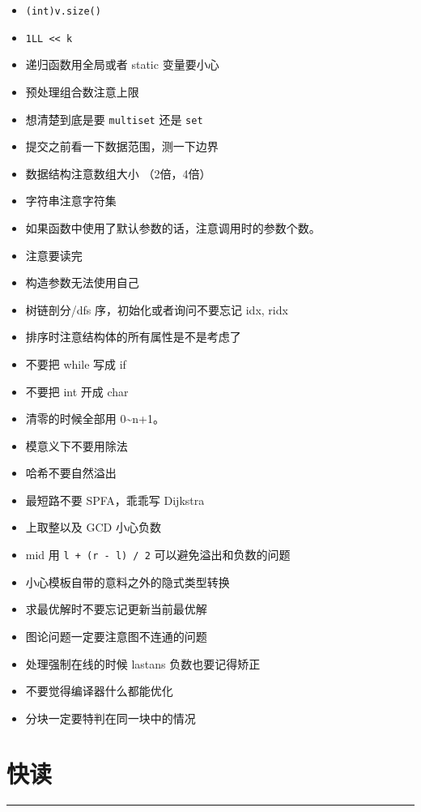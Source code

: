 \documentclass[]{article}
\providecommand{\tightlist}{%
  \setlength{\itemsep}{0pt}\setlength{\parskip}{0pt}}
\begin{document}
\begin{itemize}
\tightlist
\item
  \texttt{(int)v.size()}
\item
  \texttt{1LL\ \textless{}\textless{}\ k}
\item
  递归函数用全局或者 static 变量要小心
\item
  预处理组合数注意上限
\item
  想清楚到底是要 \texttt{multiset} 还是 \texttt{set}
\item
  提交之前看一下数据范围，测一下边界
\item
  数据结构注意数组大小 （2倍，4倍）
\item
  字符串注意字符集
\item
  如果函数中使用了默认参数的话，注意调用时的参数个数。
\item
  注意要读完
\item
  构造参数无法使用自己
\item
  树链剖分/dfs 序，初始化或者询问不要忘记 idx, ridx
\item
  排序时注意结构体的所有属性是不是考虑了
\item
  不要把 while 写成 if
\item
  不要把 int 开成 char
\item
  清零的时候全部用 0\textasciitilde n+1。
\item
  模意义下不要用除法
\item
  哈希不要自然溢出
\item
  最短路不要 SPFA，乖乖写 Dijkstra
\item
  上取整以及 GCD 小心负数
\item
  mid 用 \texttt{l\ +\ (r\ -\ l)\ /\ 2} 可以避免溢出和负数的问题
\item
  小心模板自带的意料之外的隐式类型转换
\item
  求最优解时不要忘记更新当前最优解
\item
  图论问题一定要注意图不连通的问题
\item
  处理强制在线的时候 lastans 负数也要记得矫正
\item
  不要觉得编译器什么都能优化
\item
  分块一定要特判在同一块中的情况
\end{itemize}

\hypertarget{ux5febux8bfb}{%
\section{快读}\label{ux5febux8bfb}}

\begin{center}\rule{0.5\linewidth}{0.5pt}\end{center}
\end{document}
